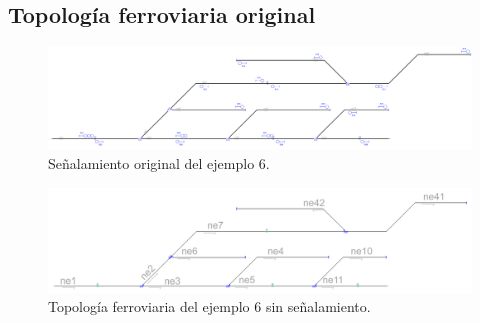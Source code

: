 \subsection{Topología ferroviaria original}

\lipsum[2]


\begin{figure}[H]
	\centering
	\includegraphics[width=1\textwidth]{resultados-obtenidos/ejemplo6/images/6_original.png}
	\centering\caption{Señalamiento original del ejemplo 6.}
\end{figure}

\lipsum[2]

\begin{figure}[H]
	\centering
	\includegraphics[width=1\textwidth]{resultados-obtenidos/ejemplo6/images/6_empty.png}
	\centering\caption{Topología ferroviaria del ejemplo 6 sin señalamiento.}
\end{figure}

\lipsum[2]
